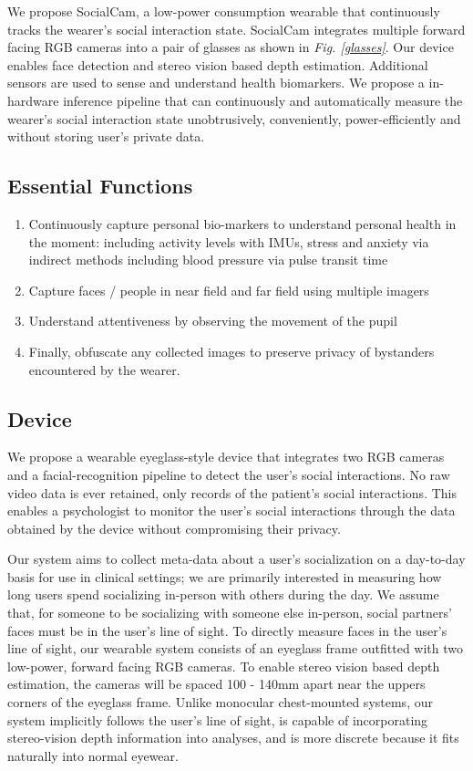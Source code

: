 We propose SocialCam, a low-power consumption wearable that continuously tracks the wearer's social interaction state. SocialCam integrates multiple forward facing RGB cameras into a pair of glasses as shown in \textit{Fig. \ref{glasses}}. Our device enables face detection and stereo vision based depth estimation. Additional sensors are used to sense and understand health biomarkers.  We propose a in-hardware inference pipeline that can continuously and automatically measure the wearer's social interaction state unobtrusively, conveniently, power-efficiently and without storing user's private data. 

\subsection{Essential Functions}
\begin{enumerate}
    \item Continuously capture personal bio-markers to understand personal health in the moment: including activity levels with IMUs, stress and anxiety via indirect methods including blood pressure via pulse transit time~\cite{}
    \item Capture faces / people in near field and far field using multiple imagers
    \item Understand attentiveness by observing the movement of the pupil
    \item Finally, obfuscate any collected images to preserve privacy of bystanders encountered by the wearer.
\end{enumerate}

\subsection{Device}
We propose a wearable eyeglass-style device that integrates two RGB cameras and a facial-recognition pipeline to detect the user's social interactions. No raw video data is ever retained, only records of the patient's social interactions. This enables a psychologist to monitor the user's social interactions through the data obtained by the device without compromising their privacy. 

Our system aims to collect meta-data about a user's socialization on a day-to-day basis for use in clinical settings; we are primarily interested in measuring how long users spend socializing in-person with others during the day. 
We assume that, for someone to be socializing with someone else in-person, social partners' faces must be in the user's line of sight. To directly measure faces in the user's line of sight, our wearable system consists of an eyeglass frame outfitted with two low-power, forward facing RGB cameras. 
To enable stereo vision based depth estimation, the cameras will be spaced 100 - 140mm apart near the uppers corners of the eyeglass frame. Unlike monocular chest-mounted systems, our system implicitly follows the user's line of sight, is capable of incorporating stereo-vision depth information into analyses, and is more discrete because it fits naturally into normal eyewear.


